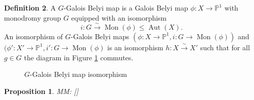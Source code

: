 \documentclass{dcthesis}
\newcommand{\PP}{\mathbb P}
\newcommand{\defi}[1]{\textsf{#1}}
\newcommand{\mm}[1]{{\color{blue} \sf MM: [#1]}}
\DeclareMathOperator{\Aut}{Aut}
\DeclareMathOperator{\Mon}{Mon}
\newtheorem{prop}{Proposition}[section]
\theoremstyle{definition}
\newtheorem{definition}[prop]{Definition}
\theoremstyle{remark}
\numberwithin{equation}{section}
\numberwithin{figure}{section}
\begin{document}
{{{\begin{definition}
        A \defi{$G$-Galois Belyi map}
        is a Galois Belyi map
        $\phi\colon X\to\PP^1$
        with monodromy group $G$
        equipped with an isomorphism
        \[
          i\colon G\stackrel{\sim}{\to}\Mon(\phi)\leq\Aut(X).
        \]
        An \defi{isomorphism of $G$-Galois Belyi maps}
        $(\phi\colon X\to\PP^1, i\colon G\to\Mon(\phi))$
        and
        $(\phi'\colon X'\to\PP^1, i'\colon G\to\Mon(\phi)$
        is an isomorphism $h\colon X\stackrel{\sim}{\to} X'$ such that
        for all $g\in G$
        the diagram in
        Figure \ref{fig:Gbelyiiso} commutes.
        \begin{figure}[ht]
          \begin{center}
          \end{center}
          \caption{$G$-Galois Belyi map isomorphism}
          \label{fig:Gbelyiiso}
        \end{figure}
        \begin{prop}\label{prop:Gauts}
          \mm{\cite[Prop. 3.6 ish]{triangles}}
        \end{prop}
      \end{definition}
    }
}}
\end{document}
